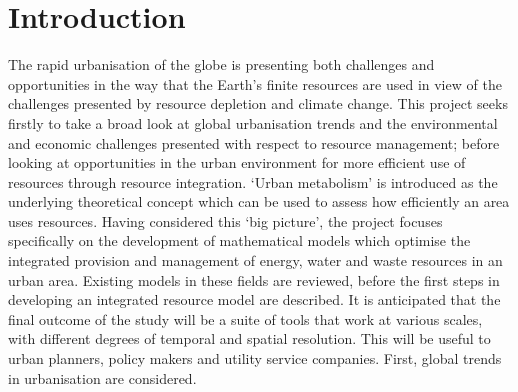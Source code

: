 \section{Introduction}
The rapid urbanisation of the globe is presenting both challenges and opportunities in the way that the Earth's finite resources are used in view of the challenges presented by resource depletion and climate change. This project seeks firstly to take a broad look at global urbanisation trends and the environmental and economic challenges presented with respect to resource management; before looking at opportunities in the urban environment for more efficient use of resources through resource integration. `Urban metabolism' is introduced as the underlying theoretical concept which can be used to assess how efficiently an area uses resources. Having considered this `big picture', the project focuses specifically on the development of mathematical models which optimise the integrated provision and management of energy, water and waste resources in an urban area. Existing models in these fields are reviewed, before the first steps in developing an integrated resource model are described. It is anticipated that the final outcome of the study will be a suite of tools that work at various scales, with different degrees of temporal and spatial resolution. This will be useful to urban planners, policy makers and utility service companies. First, global trends in urbanisation are considered.

